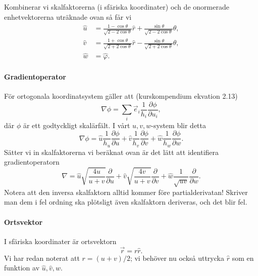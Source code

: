 \documentclass[%
oneside,                 %
final,                   %
10pt]{article}
\newenvironment{doconceexercise}{}{}
\begin{document}
\begin{doconceexercise}
Kombinerar vi skalfaktorerna (i sfäriska koordinater) och de onormerade enhetvektorerna uträknade ovan så får vi 
\begin{align}
    \hat u&= \frac{1-\cos\theta}{\sqrt{2-2\cos\theta}}\hat r+\frac{\sin\theta}{\sqrt{2-2\cos\theta}}\hat\theta,\\
    \hat v&= \frac{1+\cos\theta}{\sqrt{2+2\cos\theta}}\hat r-\frac{\sin\theta}{\sqrt{2+2\cos\theta}}\hat\theta,\\
    \hat w&=\hat\varphi.
    \label{eq:enhetsvektorer}
\end{align}

\paragraph{Gradientoperator}
För ortogonala koordinatsystem gäller att (kurskompendium ekvation 2.13)
\begin{equation}
    \nabla\phi=\sum_i\vec e_i\frac 1{h_i}\frac{\partial\phi}{\partial u_i},
\end{equation}
där $\phi$ är ett godtyckligt skalärfält. I vårt $u,v,w$-system blir detta
\begin{equation}
    \nabla\phi=\hat u\frac 1{h_u}\frac{\partial\phi}{\partial u}+\hat v\frac 1{h_v}\frac{\partial\phi}{\partial v}+\hat w\frac 1{h_w}\frac{\partial\phi}{\partial w}.
\end{equation}
Sätter vi in skalfaktorerna vi beräknat ovan är det lätt att identifiera gradientoperatorn
\begin{equation}
    \nabla = \hat u\sqrt{\frac{4u}{u+v}}\frac{\partial}{\partial u}+\hat v\sqrt{\frac{4v}{u+v}}\frac{\partial}{\partial v}+\hat w\frac 1{\sqrt{uv}}\frac{\partial}{\partial w}.
\end{equation}
Notera att den inversa skalfaktorn alltid kommer före partialderivatan! Skriver man dem i fel ordning ska plötsligt även skalfaktorn deriveras, och det blir fel.

\paragraph{Ortsvektor}
I sfäriska koordinater är ortsvektorn 
\begin{equation}
    \vec r=r\hat r.
\end{equation}
Vi har redan noterat att $r=(u+v)/2$; vi behöver nu också uttrycka $\hat r$ som en funktion av $\hat u,\hat v, \hat w$. 


\end{doconceexercise}
\end{document}
